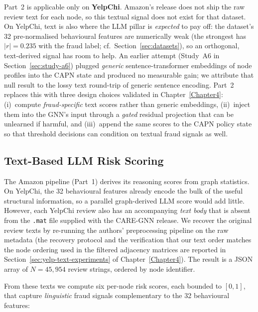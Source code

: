 Part~2 is applicable only on \textbf{YelpChi}. Amazon's release does not ship the raw review text for each node, so this textual signal does not exist for that dataset. On YelpChi, text is also where the LLM pillar is \emph{expected} to pay off: the dataset's 32 pre-normalised behavioural features are numerically weak (the strongest has $|r| = 0.235$ with the fraud label; cf.\ Section~\ref{sec:datasets}), so an orthogonal, text-derived signal has room to help. An earlier attempt (Study~A6 in Section~\ref{sec:study-a6}) plugged \emph{generic} sentence-transformer embeddings of node profiles into the CAPN state and produced no measurable gain; we attribute that null result to the lossy text round-trip of generic sentence encoding. Part~2 replaces this with three design choices validated in Chapter~\ref{Chapter4}: (i)~compute \emph{fraud-specific} text scores rather than generic embeddings, (ii)~inject them into the GNN's input through a \emph{gated} residual projection that can be unlearned if harmful, and (iii)~append the same scores to the CAPN policy state so that threshold decisions can condition on textual fraud signals as well.

\subsection{Text-Based LLM Risk Scoring}
\label{sec:text-risk-scores}

The Amazon pipeline (Part~1) derives its reasoning scores from graph statistics. On YelpChi, the 32 behavioural features already encode the bulk of the useful structural information, so a parallel graph-derived LLM score would add little. However, each YelpChi review also has an accompanying \emph{text body} that is absent from the \texttt{.mat} file supplied with the CARE-GNN release. We recover the original review texts by re-running the authors' preprocessing pipeline on the raw metadata (the recovery protocol and the verification that our text order matches the node ordering used in the filtered adjacency matrices are reported in Section~\ref{sec:yelp-text-experiments} of Chapter~\ref{Chapter4}). The result is a JSON array of $N = 45{,}954$ review strings, ordered by node identifier.

From these texts we compute six per-node risk scores, each bounded to $[0, 1]$, that capture \emph{linguistic} fraud signals complementary to the 32 behavioural features:

